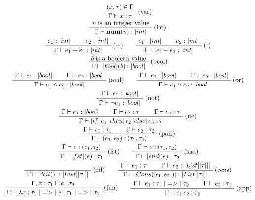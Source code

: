 \begin{gather*}
  \AxiomC{\((x, \tau) \in \Gamma\)}
  \RightLabel{(var)}
  \UnaryInfC{\(\Gamma \vdash x : \tau\)}
  \DisplayProof \\
  \AxiomC{\(n\) is an integer value}
  \RightLabel{(int)}
  \UnaryInfC{\(\Gamma \vdash \num(n) : \aint\)}
  \DisplayProof \\
  \AxiomC{\(e_1 : \aint\)}
  \AxiomC{\(e_2 : \aint\)}
  \RightLabel{(+)}
  \BinaryInfC{\(\Gamma \vdash e_1 + e_2 : \aint\)}
  \DisplayProof \qquad
  \AxiomC{\(e_1 : \aint\)}
  \AxiomC{\(e_2 : \aint\)}
  \RightLabel{(-)}
  \BinaryInfC{\(\Gamma \vdash e_1 - e_2 : \aint\)}
  \DisplayProof \\
  \AxiomC{\(b\) is a boolean value}
  \RightLabel{(bool)}
  \UnaryInfC{\(\Gamma \vdash \abool(b) : \abool\)}
  \DisplayProof \\
  \AxiomC{\(\Gamma \vdash e_1 : \abool\)}
  \AxiomC{\(\Gamma \vdash e_2 : \abool\)}
  \RightLabel{(and)}
  \BinaryInfC{\(\Gamma \vdash e_1 \land e_2 : \abool\)}
  \DisplayProof \qquad
  \AxiomC{\(\Gamma \vdash e_1 : \abool\)}
  \AxiomC{\(\Gamma \vdash e_2 : \abool\)}
  \RightLabel{(or)}
  \BinaryInfC{\(\Gamma \vdash e_1 \lor e_2 : \abool\)}
  \DisplayProof \\
  \AxiomC{\(\Gamma \vdash e_1 : \abool\)}
  \RightLabel{(not)}
  \UnaryInfC{\(\Gamma \vdash \neg e_1 : \abool\)}
  \DisplayProof \\
  \AxiomC{\(\Gamma \vdash e_1 : \abool\)}
  \AxiomC{\(\Gamma \vdash e_2 : \tau\)}
  \AxiomC{\(\Gamma \vdash e_3 : \tau\)}
  \RightLabel{(ite)}
  \TrinaryInfC{\(\Gamma \vdash \aif \, e_1 \, \athen \, e_2 \, \aelse \, e_3 : \tau\)}
  \DisplayProof \\
  \AxiomC{\(\Gamma \vdash e_1 : \tau_1\)}
  \AxiomC{\(\Gamma \vdash e_2 : \tau_2\)}
  \RightLabel{(pair)}
  \BinaryInfC{\(\Gamma \vdash \apair{e_1}{e_2} : \apair{\tau_1}{\tau_2}\)}
  \DisplayProof \\
  \AxiomC{\(\Gamma \vdash e : \apair{\tau_1}{\tau_2}\)}
  \RightLabel{(fst)}
  \UnaryInfC{\(\Gamma \vdash \afst{e} : \tau_1\)}
  \DisplayProof \qquad
  \AxiomC{\(\Gamma \vdash e : \apair{\tau_1}{\tau_2}\)}
  \RightLabel{(snd)}
  \UnaryInfC{\(\Gamma \vdash \asnd{e} : \tau_2\)}
  \DisplayProof \\
  \AxiomC{\phantom{\(e \in \alist{\tau}\)}}
  \RightLabel{(nil)}
  \UnaryInfC{\(\Gamma \vdash \anil : \alist{\tau}\)}
  \DisplayProof \qquad
  \AxiomC{\(\Gamma \vdash e_1 : \tau\)}
  \AxiomC{\(\Gamma \vdash e_2 : \alist{\tau}\)}
  \RightLabel{(cons)}
  \BinaryInfC{\(\Gamma \vdash \acons{e_1}{e_2} : \alist{\tau}\)}
  \DisplayProof \\
  \AxiomC{\(\Gamma, x : \tau_1 \vdash e : \tau_2\)}
  \RightLabel{(fun)}
  \UnaryInfC{\(\Gamma \vdash \lambda x : \tau_1 ~\ato~ e : \tau_1 ~\ato~ \tau_2\)}
  \DisplayProof \qquad
  \AxiomC{\(\Gamma \vdash e_1 : \tau_1 ~\ato~ \tau_2\)}
  \AxiomC{\(\Gamma \vdash e_2 : \tau_1\)}
  \RightLabel{(app)}
  \BinaryInfC{\(\Gamma \vdash e_1 \, e_2 : \tau_2\)}
  \DisplayProof \\
\end{gather*}
